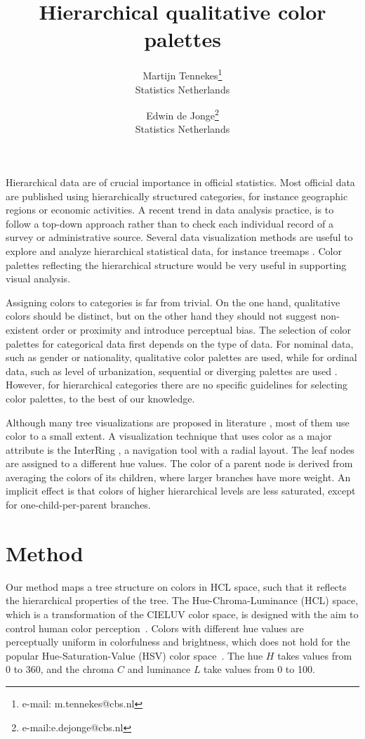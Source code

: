\documentclass[review]{vgtc}                 %
\title{Hierarchical qualitative color palettes}
\author{Martijn Tennekes\thanks{e-mail: m.tennekes@cbs.nl}\\ %
        \scriptsize Statistics Netherlands %
\and Edwin de Jonge\thanks{e-mail:e.dejonge@cbs.nl}\\ %
     \scriptsize Statistics Netherlands}
\begin{document}

\maketitle

Hierarchical data are of crucial importance in official statistics. Most official data are published using hierarchically structured categories, for instance geographic regions or economic activities. A recent trend in data analysis practice, is to follow a top-down approach rather than to check  each individual record of a survey or administrative source. Several data visualization methods are useful to explore and analyze hierarchical statistical data, for instance treemaps
\cite{shneiderman1992,tennekes2011b}. Color palettes reflecting the  hierarchical structure would be very useful in supporting visual analysis.

Assigning colors to categories is far from trivial. On the one hand, qualitative colors should be distinct, but on the other hand they should not suggest non-existent order or proximity and introduce perceptual bias. The selection of color palettes for categorical data first depends on the type of data. For nominal data, such as gender or nationality, qualitative color palettes are used, while for ordinal data, such as level of urbanization, sequential or diverging palettes are used \cite{brewer03, zeileis2009}. However, for hierarchical categories there are no specific guidelines for selecting color palettes, to the best of our knowledge.

Although many tree visualizations are proposed in literature \cite{schulz2011}, most of them use color to a small extent. A visualization technique that uses color as a major attribute is the InterRing \cite{yang2002}, a navigation tool with a radial layout. The leaf nodes are assigned to a different hue values. The color of a parent node is derived from averaging the colors of its children, where larger branches have more weight. An implicit effect is that colors of higher hierarchical levels are less saturated, except for one-child-per-parent branches.


\section{Method}

Our method maps a tree structure on colors in HCL space, such that it reflects the hierarchical properties of the tree. The Hue-Chroma-Luminance (HCL) space, which is a transformation of the CIELUV color space, is designed with the aim to control human color perception~\cite{ihaka2003}.
Colors with different hue values are perceptually uniform in colorfulness and brightness, which does not hold for the popular Hue-Saturation-Value (HSV) color space~\cite{zeileis2009}. The hue $H$ takes values from 0 to 360, and the chroma $C$ and luminance $L$ take values from 0 to 100.
\end{document}
